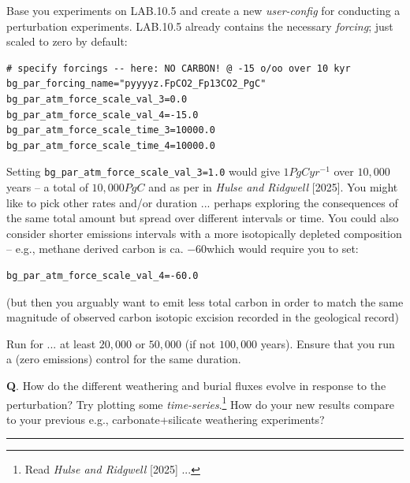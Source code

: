 \vspace{1mm}
Base you experiments on \textsf{\footnotesize LAB.10.5} and create a new \textit{user-config} for conducting a perturbation experiments. \textsf{\footnotesize LAB.10.5} already contains the necessary \textit{forcing}; just scaled to zero by default:
\vspace{-1mm}\small\begin{verbatim}
# specify forcings -- here: NO CARBON! @ -15 o/oo over 10 kyr
bg_par_forcing_name="pyyyyz.FpCO2_Fp13CO2_PgC"
bg_par_atm_force_scale_val_3=0.0
bg_par_atm_force_scale_val_4=-15.0
bg_par_atm_force_scale_time_3=10000.0
bg_par_atm_force_scale_time_4=10000.0
\end{verbatim}\normalsize\vspace{-1mm}
Setting \texttt{\small bg\_par\_atm\_force\_scale\_val\_3=1.0} would give $1 PgC yr^{-1}$ over $10,000$ years -- a total of $10,000 PgC$ and as per in \textit{Hulse and Ridgwell} [2025]. You might like to pick other rates and/or duration ... perhaps exploring the consequences of the same total amount but spread over different intervals or time. You could also consider shorter emissions intervals with a more isotopically depleted composition -- e.g., methane derived carbon is ca. \(-60\)\permille which would require you to set:
\vspace{-1mm}\small\begin{verbatim}
bg_par_atm_force_scale_val_4=-60.0
\end{verbatim}\normalsize\vspace{-1mm}
(but then you arguably want to emit less total carbon in order to match the same magnitude of observed carbon isotopic excision recorded in the geological record)

\vspace{1mm}
Run for ... at least $20,000$ or $50,000$ (if not $100,000$ years). Ensure that you run a (zero emissions) control for the same duration.

\vspace{1mm}
\noindent \textbf{Q}. How do the different weathering and burial fluxes evolve in response to the perturbation? Try plotting some \textit{time-series}.\footnote{Read \textit{Hulse and Ridgwell} [2025] ...} How do your new results compare to your previous e.g., carbonate+silicate weathering experiments?

\vspace{1mm}\noindent\rule{4cm}{0.1mm}\vspace{2mm}

